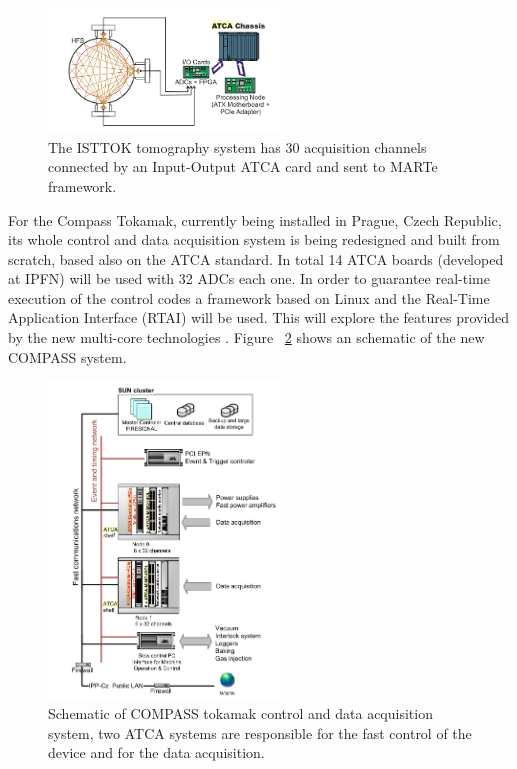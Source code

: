 \begin{figure}[htbp]
	\centering
	\includegraphics[width=0.55\textwidth]{Chp2/Tomogr.png}
	\caption{\label{Tomog}  The ISTTOK tomography system has 30 acquisition channels connected by an Input-Output ATCA card and sent to MARTe framework.  \cite{Ivo_tomo}}
	
\end{figure}

For the Compass Tokamak, currently being installed in Prague, Czech Republic, its whole control and data acquisition system is being redesigned and built from scratch, based also on the ATCA standard. In total 14 ATCA  boards (developed at IPFN) will be used with 32 ADCs each one. In order to guarantee real-time execution of the control codes a framework based on Linux and the Real-Time Application Interface (RTAI) will be used. This will explore the features provided by the new multi-core technologies \cite{ATCA2010}. Figure  ~\ref{Compass} shows an schematic of the new COMPASS system.
\smallskip


\begin{figure}[htbp]
	\centering
	\includegraphics[width=0.55\textwidth]{Chp2/COMPASS_ATCA.png}
	\caption{\label{Compass} Schematic of COMPASS tokamak control and data acquisition
		system,  two ATCA systems are responsible for the fast control of the device and for the data acquisition. \cite{ATCA2010}}
	
\end{figure}


